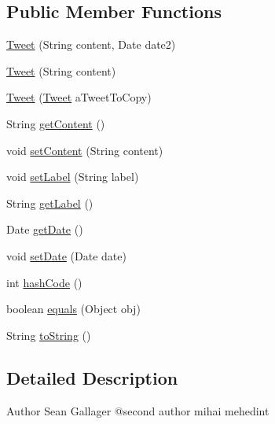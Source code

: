 \subsection*{Public Member Functions}
\begin{DoxyCompactItemize}
\item 
\mbox{\hyperlink{classbridges_1_1data__src__dependent_1_1_tweet_a615278c2672b2cb310d3c645566ad5cd}{Tweet}} (String content, Date date2)
\item 
\mbox{\hyperlink{classbridges_1_1data__src__dependent_1_1_tweet_a611e969f630c86098b204cfb4655f79b}{Tweet}} (String content)
\item 
\mbox{\hyperlink{classbridges_1_1data__src__dependent_1_1_tweet_a0b0ee5fa9a6221da95020bd5f78667d9}{Tweet}} (\mbox{\hyperlink{classbridges_1_1data__src__dependent_1_1_tweet}{Tweet}} a\+Tweet\+To\+Copy)
\item 
String \mbox{\hyperlink{classbridges_1_1data__src__dependent_1_1_tweet_a9b48f1ffc14fea21eb8a3e742601974a}{get\+Content}} ()
\item 
void \mbox{\hyperlink{classbridges_1_1data__src__dependent_1_1_tweet_a80ac618b5817392ce356657b2bf4145a}{set\+Content}} (String content)
\item 
void \mbox{\hyperlink{classbridges_1_1data__src__dependent_1_1_tweet_aa193633f4f61cc957f05a1c551f18822}{set\+Label}} (String label)
\item 
String \mbox{\hyperlink{classbridges_1_1data__src__dependent_1_1_tweet_a4b31431e42327efa953adde4c15cf168}{get\+Label}} ()
\item 
Date \mbox{\hyperlink{classbridges_1_1data__src__dependent_1_1_tweet_a801b0b5ea0127746c9c8ec0fc5e35ac2}{get\+Date}} ()
\item 
void \mbox{\hyperlink{classbridges_1_1data__src__dependent_1_1_tweet_a1a57c028bb87ad4e94af496a7260ffe9}{set\+Date}} (Date date)
\item 
int \mbox{\hyperlink{classbridges_1_1data__src__dependent_1_1_tweet_adf7dadcda59b68bb00b42480e4ad9956}{hash\+Code}} ()
\item 
boolean \mbox{\hyperlink{classbridges_1_1data__src__dependent_1_1_tweet_ae5edb76b9dd0f76b56eb40aa7c8cc077}{equals}} (Object obj)
\item 
String \mbox{\hyperlink{classbridges_1_1data__src__dependent_1_1_tweet_adfba67504a7463a7f16aff46d2bb893f}{to\+String}} ()
\end{DoxyCompactItemize}


\subsection{Detailed Description}
\begin{DoxyAuthor}{Author}
Sean Gallager @second author mihai mehedint 
\end{DoxyAuthor}


